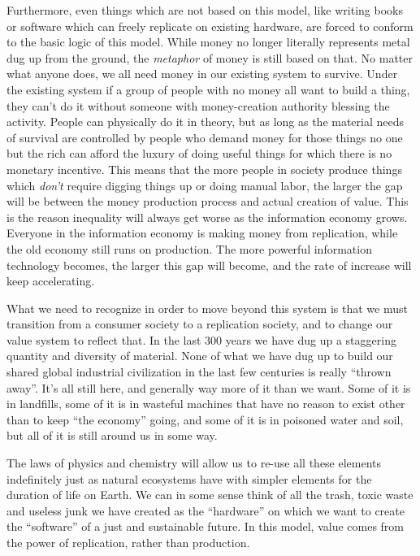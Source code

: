 Furthermore, even things which are not based on this model, like writing
books or software which can freely replicate on existing hardware, are
forced to conform to the basic logic of this model. While money no
longer literally represents metal dug up from the ground, the
\emph{metaphor} of money is still based on that. No matter what anyone
does, we all need money in our existing system to survive. Under the
existing system if a group of people with no money all want to build a
thing, they can't do it without someone with money-creation authority
blessing the activity. People can physically do it in theory, but as
long as the material needs of survival are controlled by people who
demand money for those things no one but the rich can afford the luxury
of doing useful things for which there is no monetary incentive. This
means that the more people in society produce things which \emph{don't}
require digging things up or doing manual labor, the larger the gap will
be between the money production process and actual creation of value.
This is the reason inequality will always get worse as the information
economy grows. Everyone in the information economy is making money from
replication, while the old economy still runs on production. The more
powerful information technology becomes, the larger this gap will
become, and the rate of increase will keep accelerating.

What we need to recognize in order to move beyond this system is that we
must transition from a consumer society to a replication society, and to
change our value system to reflect that. In the last 300 years we have
dug up a staggering quantity and diversity of material. None of what we
have dug up to build our shared global industrial civilization in the
last few centuries is really ``thrown away''. It's all still here, and
generally way more of it than we want. Some of it is in landfills, some
of it is in wasteful machines that have no reason to exist other than to
keep ``the economy'' going, and some of it is in poisoned water and
soil, but all of it is still around us in some way.

The laws of physics and chemistry will allow us to re-use all these
elements indefinitely just as natural ecosystems have with simpler
elements for the duration of life on Earth. We can in some sense think
of all the trash, toxic waste and useless junk we have created as the
``hardware'' on which we want to create the ``software'' of a just and
sustainable future. In this model, value comes from the power of
replication, rather than production.

